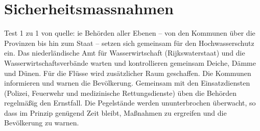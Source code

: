 \section{Sicherheitsmassnahmen}  
Test 1 zu 1 von quelle:
\newline\newline
ie Behörden aller Ebenen – von den Kommunen über die Provinzen bis 
hin zum Staat – setzen sich gemeinsam für den Hochwasserschutz ein.
 Das niederländische Amt für Wasserwirtschaft (Rijkswaterstaat) und
  die Wasserwirtschaftsverbände warten und kontrollieren gemeinsam 
  Deiche, Dämme und Dünen. Für die Flüsse wird zusätzlicher Raum 
  geschaffen. Die Kommunen informieren und warnen die Bevölkerung.
   Gemeinsam mit den Einsatzdiensten (Polizei, Feuerwehr und 
   medizinische Rettungsdienste) üben die Behörden regelmäßig
    den Ernstfall. Die Pegelstände werden ununterbrochen überwacht, 
    so dass im Prinzip genügend Zeit bleibt, Maßnahmen zu ergreifen
     und die Bevölkerung zu warnen.    

 